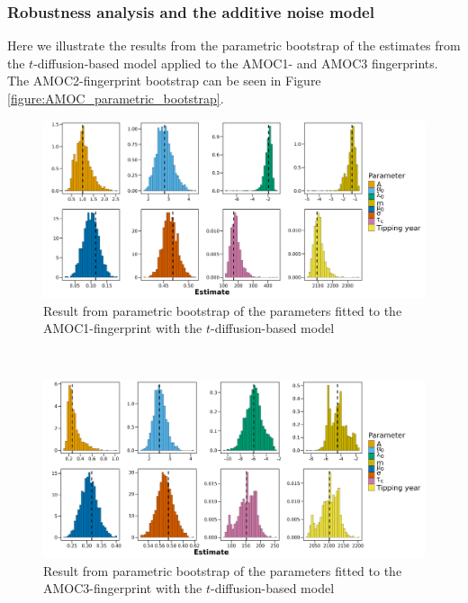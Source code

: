 \subsubsection{Robustness analysis and the additive noise model}\label{subsubsec:RobustnessAnalysisAppendix}
Here we illustrate the results from the parametric bootstrap of the estimates from the $t$-diffusion-based model applied to the AMOC1- and AMOC3 fingerprints. The AMOC2-fingerprint bootstrap can be seen in Figure \ref{figure:AMOC_parametric_bootstrap}.
\begin{figure}[h!]
    \begin{center}
        \includegraphics[scale = .09]{figures/estim_tibble_AMOC1_plot.jpeg}
        \caption{Result from parametric bootstrap of the parameters fitted to the AMOC1-fingerprint with the $t$-diffusion-based model}
        \label{figure:AMOC1_t_diffusion_bootstrap}
    \end{center}
\end{figure}\\
\begin{figure}[h!]
    \begin{center}
        \includegraphics[scale = .095]{figures/estim_tibble_AMOC3_plot.jpeg}
        \caption{Result from parametric bootstrap of the parameters fitted to the AMOC3-fingerprint with the $t$-diffusion-based model}
        \label{figure:AMOC3_t_diffusion_bootstrap}
    \end{center}
\end{figure}\\
